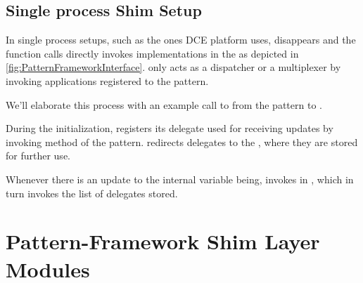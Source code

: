 \subsection{Single process Shim Setup}

In single process setups, such as the ones DCE platform uses,  disappears and the function calls directly invokes implementations in the  as depicted in \cref{fig:PatternFrameworkInterface}.  only acts as a dispatcher or a multiplexer by invoking applications registered to the pattern. 

We'll elaborate this process with an example call to  from the  pattern to . 

During the initialization,  registers its delegate used for receiving updates by invoking  method of the  pattern.  redirects delegates to the , where they are stored for further use. 

Whenever there is an update to the internal variable being,  invokes   in , which in turn invokes the list of delegates stored. 


\section{Pattern-Framework Shim Layer Modules} \label{sec:PatFrameworkInterface}


